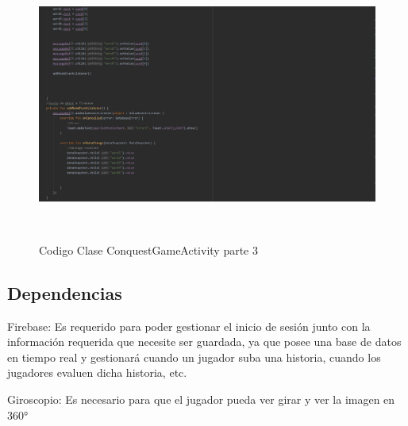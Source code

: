 \begin{figure}[H]
	\centering
	\includegraphics[width=16cm, height=9cm]{imgs/SourceCode3.jpg}
	\caption{Codigo Clase ConquestGameActivity parte 3}
\end{figure}
\subsection{Dependencias}
Firebase: Es requerido para poder gestionar el inicio de sesión junto con la información requerida
que necesite ser guardada, ya que posee una base de datos en tiempo real y gestionará cuando un jugador suba una historia, cuando los jugadores evaluen dicha historia, etc.

Giroscopio: Es necesario para que el jugador pueda ver girar y ver la imagen en 360°


